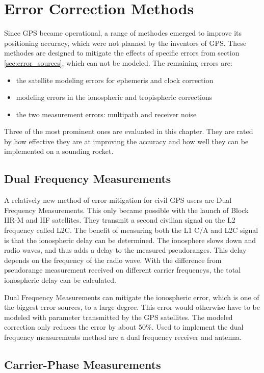 \chapter{Error Correction Methods}

Since GPS became operational, a range of methodes emerged to improve its positioning accuracy, which were not planned by the inventors of GPS.
These methodes are designed to mitigate the effects of specific errors from section \ref{sec:error_sources}, which can not be modeled.
The remaining errors are:
\begin{itemize}
 \setlength\itemsep{1pt}
 \item the satellite modeling errors for ephemeris and clock correction
 \item modeling errors in the ionospheric and tropispheric corrections
 \item the two measurement errors: multipath and receiver noise
\end{itemize}
Three of the most prominent ones are evaluated in this chapter.
They are rated by how effective they are at improving the accuracy and how well they can be implemented on a sounding rocket.


\section{Dual Frequency Measurements}

A relatively new method of error mitigation for civil GPS users are Dual Frequency Measurements.
This only became possible with the launch of Block IIR-M and IIF satellites.
They transmit a second civilian signal on the L2 frequency called L2C.
The benefit of measuring both the L1 C/A and L2C signal is that the ionospheric delay can be determined.
The ionosphere slows down and radio waves, and thus adds a delay to the measured pseudoranges.
This delay depends on the frequency of the radio wave.
With the difference from pseudorange measurement received on different carrier frequencys, the total ionospheric delay can be calculated.

Dual Frequency Measurements can mitigate the ionospheric error, which is one of the biggest error sources, to a large degree.
This error would otherwise have to be modeled with parameter transmitted by the GPS satellites.
The modeled correction only reduces the error by about 50\%.
Used to implement the dual frequency measurements method are a dual frequency receiver and antenna.
\cite{L1_L2}


\section{Carrier-Phase Measurements}

